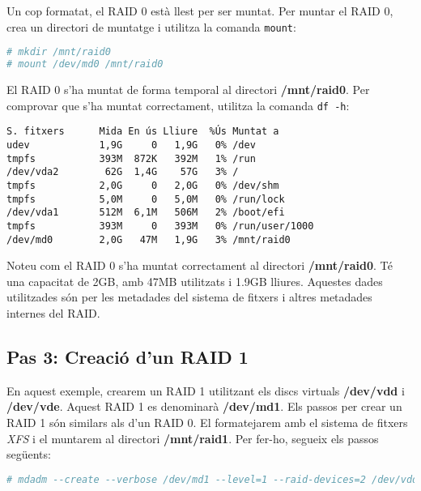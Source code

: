 Un cop formatat, el RAID 0 està llest per ser muntat. Per muntar el RAID 0, crea un directori de muntatge i utilitza la comanda \texttt{mount}:

\begin{lstlisting}[language=bash, numbers=none, commentstyle=\color{black}]
# mkdir /mnt/raid0
# mount /dev/md0 /mnt/raid0
\end{lstlisting}

El RAID 0 s'ha muntat de forma temporal al directori \textbf{/mnt/raid0}. Per comprovar que s'ha muntat correctament, utilitza la comanda \texttt{df -h}:

\begin{terminaloutput}
\footnotesize\begin{verbatim}
S. fitxers      Mida En ús Lliure  %Ús Muntat a
udev            1,9G     0   1,9G   0% /dev
tmpfs           393M  872K   392M   1% /run
/dev/vda2        62G  1,4G    57G   3% /
tmpfs           2,0G     0   2,0G   0% /dev/shm
tmpfs           5,0M     0   5,0M   0% /run/lock
/dev/vda1       512M  6,1M   506M   2% /boot/efi
tmpfs           393M     0   393M   0% /run/user/1000
/dev/md0        2,0G   47M   1,9G   3% /mnt/raid0
\end{verbatim}
\end{terminaloutput}

Noteu com el RAID 0 s'ha muntat correctament al directori \textbf{/mnt/raid0}. Té una capacitat de 2GB, amb 47MB utilitzats i 1.9GB lliures. Aquestes dades utilitzades són per les metadades del sistema de fitxers i altres metadades internes del RAID.

\subsection{Pas 3: Creació d'un RAID 1}\label{pas-3-creació-dun-raid-1}

En aquest exemple, crearem un RAID 1 utilitzant els discs virtuals \textbf{/dev/vdd} i \textbf{/dev/vde}. Aquest RAID 1 es denominarà \textbf{/dev/md1}. Els passos per crear un RAID 1 són similars als d'un RAID 0. El formatejarem amb el sistema de fitxers \emph{XFS} i el muntarem al directori \textbf{/mnt/raid1}. Per fer-ho, segueix els passos següents:

\begin{lstlisting}[language=bash, numbers=none, commentstyle=\color{black}]
# mdadm --create --verbose /dev/md1 --level=1 --raid-devices=2 /dev/vdd /dev/vde
\end{lstlisting}

